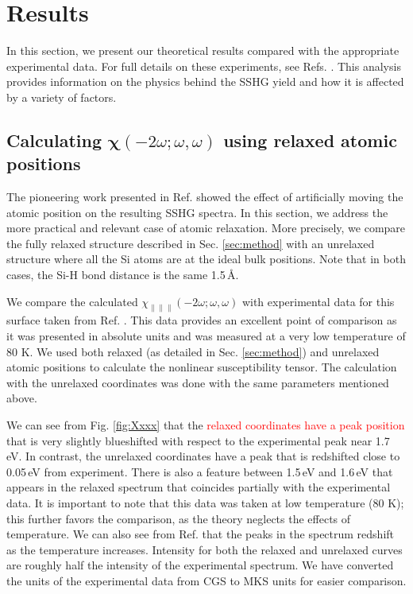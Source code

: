 \documentclass[prb,superscriptaddress,showpacs,twocolumn,letterpaper]{revtex4}
\newcommand{\correction}[1]{\textcolor{red}{#1}}
\begin{document}
\section{Results}\label{sec:results}

In this section, we present our theoretical results compared with the
appropriate experimental data. For full details on these experiments, see Refs.
. This analysis
provides information on the physics behind the SSHG yield and how it is affected
by a variety of factors.


\subsection{Calculating
\texorpdfstring{$\boldsymbol{\chi}(-2\omega;\omega,\omega)$}{X(-2w;w,w)} using
relaxed atomic positions}\label{sec:relaxed}

The pioneering work presented in Ref.  showed the effect
of artificially moving the atomic position on the resulting SSHG spectra. In
this section, we address the more practical and relevant case of atomic
relaxation. More precisely, we compare the fully relaxed structure described in
Sec. \ref{sec:method} with an unrelaxed structure where all the Si atoms are at
the ideal bulk positions. Note that in both cases, the Si-H bond distance is the
same 1.5\,\AA.

We compare the calculated
$\chi_{\parallel\parallel\parallel}(-2\omega;\omega,\omega)$ with experimental
data for this surface taken from Ref. . This data
provides an excellent point of comparison as it was presented in absolute units
and was measured at a very low temperature of 80 K. We used both relaxed (as
detailed in Sec. \ref{sec:method}) and unrelaxed atomic positions to calculate
the nonlinear susceptibility tensor. The calculation with the unrelaxed
coordinates was done with the same parameters mentioned above.

We can see from Fig. \ref{fig:Xxxx} that the 
\correction{relaxed coordinates have a peak position} %
that is very slightly blueshifted with respect to the experimental peak near
1.7\,eV. In contrast, the unrelaxed coordinates have a peak that is redshifted
close to 0.05\,eV from experiment. There is also a feature between 1.5\,eV and
1.6\,eV that appears in the relaxed spectrum that coincides partially with the
experimental data. It is important to note that this data was taken at low
temperature (80 K); this further favors the comparison, as the theory neglects
the effects of temperature. We can also see from Ref. 
that the peaks in the spectrum redshift as the temperature increases. Intensity
for both the relaxed and unrelaxed curves are roughly half the intensity of the
experimental spectrum. We have converted the units of the experimental data from
CGS to MKS units for easier comparison.
\end{document}
